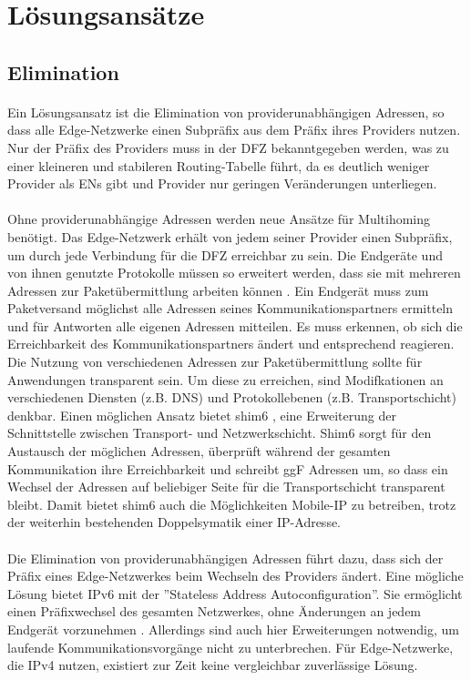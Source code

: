 \section{Lösungsansätze}
\subsection{Elimination}
\paragraph{}
Ein Lösungsansatz ist die Elimination von providerunabhängigen Adressen, so dass alle Edge-Netzwerke einen Subpräfix aus dem Präfix ihres Providers nutzen. Nur der Präfix des Providers muss in der DFZ bekanntgegeben werden, was zu einer kleineren und stabileren Routing-Tabelle führt, da es deutlich weniger Provider als ENs gibt und Provider nur geringen Veränderungen unterliegen.

\paragraph{}
Ohne providerunabhängige Adressen werden neue Ansätze für Multihoming benötigt. Das Edge-Netzwerk erhält von jedem seiner Provider einen Subpräfix, um durch jede Verbindung für die DFZ erreichbar zu sein. Die Endgeräte und von ihnen genutzte Protokolle müssen so erweitert werden, dass sie mit mehreren Adressen zur Paketübermittlung arbeiten können \cite{jen:2008:start}. Ein Endgerät muss zum Paketversand möglichst alle Adressen seines Kommunikationspartners ermitteln und für Antworten alle eigenen Adressen mitteilen. Es muss erkennen, ob sich die Erreichbarkeit des Kommunikationspartners ändert und entsprechend reagieren. Die Nutzung von verschiedenen Adressen zur Paketübermittlung sollte für Anwendungen transparent sein. Um diese zu erreichen, sind Modifkationen an verschiedenen Diensten (z.B. DNS) und Protokollebenen (z.B. Transportschicht) denkbar. Einen möglichen Ansatz bietet shim6 \cite{nordmark:2009:RFC5533}, eine Erweiterung der Schnittstelle zwischen Transport- und Netzwerkschicht. Shim6 sorgt für den Austausch der möglichen Adressen, überprüft während der gesamten Kommunikation ihre Erreichbarkeit und schreibt ggF Adressen um, so dass ein Wechsel der Adressen auf beliebiger Seite für die Transportschicht transparent bleibt. Damit bietet shim6 auch die Möglichkeiten Mobile-IP zu betreiben, trotz der weiterhin bestehenden Doppelsymatik einer IP-Adresse. 
 
\paragraph{}
Die Elimination von providerunabhängigen Adressen führt dazu, dass sich der Präfix eines Edge-Netzwerkes beim Wechseln des Providers ändert. Eine mögliche Lösung bietet IPv6 mit der ''Stateless Address Autoconfiguration''. Sie ermöglicht einen Präfixwechsel des gesamten Netzwerkes, ohne Änderungen an jedem Endgerät vorzunehmen \cite{RFC4862}. Allerdings sind auch hier Erweiterungen notwendig, um laufende Kommunikationsvorgänge nicht zu unterbrechen. Für Edge-Netzwerke, die IPv4 nutzen, existiert zur Zeit keine vergleichbar zuverlässige Lösung.

